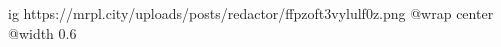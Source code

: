  
 
 
 
 

\ifcmt
  ig https://mrpl.city/uploads/posts/redactor/ffpzoft3vylulf0z.png
  @wrap center
  @width 0.6
\fi
